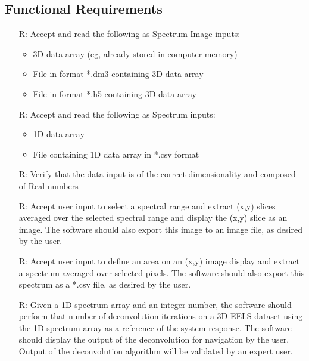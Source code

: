 \documentclass[12pt]{article}
\newcounter{reqnum} %
\begin{document}
\subsection{Functional Requirements}

\noindent \begin{itemize}

\item[R\refstepcounter{reqnum}\thereqnum \label{R_Inputs}:] Accept and read the following as Spectrum Image inputs:

\begin{itemize}
	\item 3D data array (eg, already stored in computer memory)
	\item File in format *.dm3 containing 3D data array
	\item File in format *.h5 containing 3D data array
\end{itemize}

\item[R\refstepcounter{reqnum}\thereqnum \label{R_Inputs}:] Accept and read the following as Spectrum inputs:

\begin{itemize}
	\item 1D data array
	\item File containing 1D data array in *.csv format
\end{itemize}

\item[R\refstepcounter{reqnum}\thereqnum \label{R_Inputs}:] Verify that the data input is of the correct dimensionality and composed of Real numbers

\item[R\refstepcounter{reqnum}\thereqnum \label{R_Inputs}:] Accept user input to select a spectral range and extract (x,y) slices averaged over the selected spectral range and display the (x,y) slice as an image. The software should also export this image to an image file, as desired by the user.

\item[R\refstepcounter{reqnum}\thereqnum \label{R_Inputs}:] Accept user input to define an area on an (x,y) image display and extract a spectrum averaged over selected pixels. The software should also export this spectrum as a *.csv file, as desired by the user.

\item[R\refstepcounter{reqnum}\thereqnum \label{R_Inputs}:] Given a 1D spectrum array and an integer number, the software should perform that number of deconvolution iterations on a 3D EELS dataset using the 1D spectrum array as a reference of the system response. The software should display the output of the deconvolution for navigation by the user. Output of the deconvolution algorithm will be validated by an expert user. 


\end{itemize}
\end{document}
